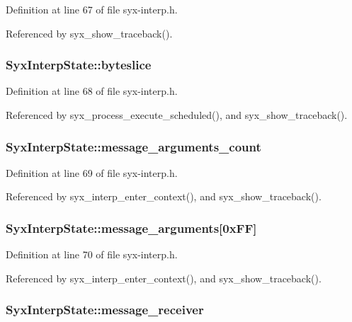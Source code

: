 Definition at line 67 of file syx-interp.h.

Referenced by syx\_\-show\_\-traceback().\hypertarget{struct_syx_interp_state_91e90bd79f62f35a5746aef791506acb}{
\subsubsection{ {\bf SyxInterpState::byteslice}}}
\label{struct_syx_interp_state_91e90bd79f62f35a5746aef791506acb}




Definition at line 68 of file syx-interp.h.

Referenced by syx\_\-process\_\-execute\_\-scheduled(), and syx\_\-show\_\-traceback().\hypertarget{struct_syx_interp_state_4ae56ccb657af2c4933b3ee8353b071e}{
\subsubsection{ {\bf SyxInterpState::message\_\-arguments\_\-count}}}
\label{struct_syx_interp_state_4ae56ccb657af2c4933b3ee8353b071e}




Definition at line 69 of file syx-interp.h.

Referenced by syx\_\-interp\_\-enter\_\-context(), and syx\_\-show\_\-traceback().\hypertarget{struct_syx_interp_state_7f74dc0eca9d27cc7fc5aa7e2a7d3e20}{
\subsubsection{ {\bf SyxInterpState::message\_\-arguments}\mbox{[}0xFF\mbox{]}}}
\label{struct_syx_interp_state_7f74dc0eca9d27cc7fc5aa7e2a7d3e20}




Definition at line 70 of file syx-interp.h.

Referenced by syx\_\-interp\_\-enter\_\-context(), and syx\_\-show\_\-traceback().\hypertarget{struct_syx_interp_state_d5b8d2093857c4a4d0fa5493ea3d2f25}{
\subsubsection{ {\bf SyxInterpState::message\_\-receiver}}}
\label{struct_syx_interp_state_d5b8d2093857c4a4d0fa5493ea3d2f25}




